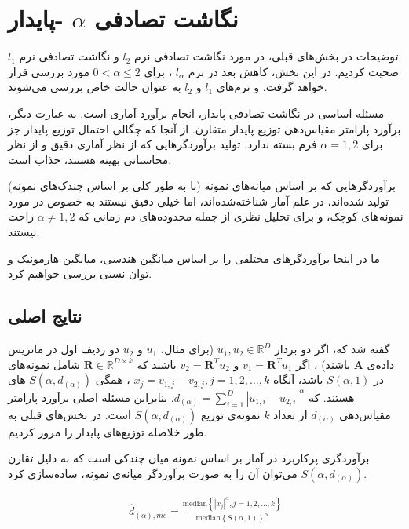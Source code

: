 \section{
نگاشت تصادفی 
$\alpha$
-پایدار
}
توضیحات
در بخش‌های قبلی، در مورد نگاشت تصادفی نرم 
$l_2$
و نگاشت تصادفی نرم
$l_1$
صحبت کردیم. در این بخش، کاهش بعد در نرم 
$l_\alpha$
، برای 
$0 < \alpha \leq 2$
مورد بررسی قرار خواهد گرفت. و نرم‌های 
$l_1$
و 
$l_2$
به عنوان حالت خاص بررسی می‌شوند.

مسئله اساسی در نگاشت تصادفی پایدار، انجام برآورد آماری است. به عبارت دیگر، برآورد پارامتر مقیاس‌دهی توزیع پایدار متقارن. از آنجا که  چگالی احتمال توزیع پایدار جز برای 
$\alpha = 1, 2$
فرم بسته‌ ندارد. تولید برآوردگرهایی که از نظر آماری دقیق و از نظر محاسباتی بهینه هستند، جذاب است.

برآوردگرهایی که بر اساس میانه‌های نمونه (با به طور کلی بر اساس چندک‌های نمونه) تولید شده‌اند، در علم آمار شناخته‌شده‌اند، اما خیلی دقیق نیستند به خصوص در مورد نمونه‌های کوچک، و برای تحلیل نظری از جمله محدوده‌های دم زمانی که 
$\alpha \neq 1, 2$
راحت نیستند. 

ما در اینجا برآوردگر‌های مختلفی را بر اساس میانگین هندسی، میانگین هارمونیک
 و توان نسبی 
بررسی خواهیم کرد.


\subsection{
نتایج اصلی
}
گفته شد که، اگر دو بردار 
$u_1, u_2 \in \mathbb{R}^D$
(برای مثال،
$u_1$
و 
$u_2$
دو ردیف اول در ماتریس داده‌ی 
$\mathbf{A}$
باشند)
، اگر 
$v_1 = \mathbf{R}^T u_1$
و 
$v_2 = \mathbf{R}^T u_2$
باشند که 
$\mathbf{R} \in \mathbb{R}^{D \times k}$
شامل نمونه‌های 
در 
$S(\alpha, 1)$
باشد، آنگاه 
$x_j = v_{1,j} - v_{2,j}, j = 1,2, \ldots, k$
، همگی
$S(\alpha, d_{(\alpha)})$
های 
هستند. که
$d_{(\alpha)} = \sum_{i=1}^D \left| u_{1,i} - u_{2,i} \right|^{\alpha}$.
بنابراین مسئله اصلی برآورد پارامتر مقیاس‌دهی 
$d_{(\alpha)}$
از تعداد 
$k$
نمونه‌ی 
توزیع
$S(\alpha, d_{(\alpha)})$
است. 
در بخش‌های قبلی به طور خلاصله توزیع‌های پایدار را مرور کردیم.

برآوردگری پرکاربرد در آمار بر اساس نمونه میان چندکی %
\cite{litez67, litez68, litez138}
است  که به دلیل تقارن 
$S(\alpha, d_{(\alpha)})$
می‌توان آن را به صورت برآوردگر میانه‌ی نمونه، ساده‌سازی کرد.

\begin{align}
\hat{d}_{(\alpha),me} = \frac
{ \mathrm{median} \left \{ \left| x_j \right|^{\alpha} , j = 1,2, \ldots, k \right \} }
{ \mathrm{median} \left \{ S(\alpha, 1) \right \}^{\alpha} }
\label{eq:1iW}
\end{align}


